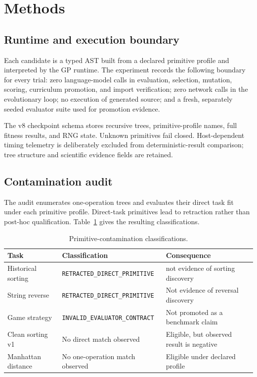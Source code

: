 \documentclass[11pt]{article}
\begin{document}
\section{Methods}

\subsection{Runtime and execution boundary}

Each candidate is a typed AST built from a declared primitive profile and interpreted by the GP runtime. The experiment records the following boundary for every trial: zero language-model calls in evaluation, selection, mutation, scoring, curriculum promotion, and import verification; zero network calls in the evolutionary loop; no execution of generated source; and a fresh, separately seeded evaluator suite used for promotion evidence.

The v8 checkpoint schema stores recursive trees, primitive-profile names, full fitness results, and RNG state. Unknown primitives fail closed. Host-dependent timing telemetry is deliberately excluded from deterministic-result comparison; tree structure and scientific evidence fields are retained.

\subsection{Contamination audit}

The audit enumerates one-operation trees and evaluates their direct task fit under each primitive profile. Direct-task primitives lead to retraction rather than post-hoc qualification. Table~\ref{tab:contamination} gives the resulting classifications.

\begin{table}[ht]
\centering
\caption{Primitive-contamination classifications.}
\label{tab:contamination}
\begin{tabular}{lll}
\toprule
Task & Classification & Consequence \\
\midrule
Historical sorting & \texttt{RETRACTED\_DIRECT\_PRIMITIVE} & not evidence of sorting discovery \\
String reverse & \texttt{RETRACTED\_DIRECT\_PRIMITIVE} & Not evidence of reversal discovery \\
Game strategy & \texttt{INVALID\_EVALUATOR\_CONTRACT} & Not promoted as a benchmark claim \\
Clean sorting v1 & No direct match observed & Eligible, but observed result is negative \\
Manhattan distance & No one-operation match observed & Eligible under declared profile \\
\bottomrule
\end{tabular}
\end{table}
\end{document}
